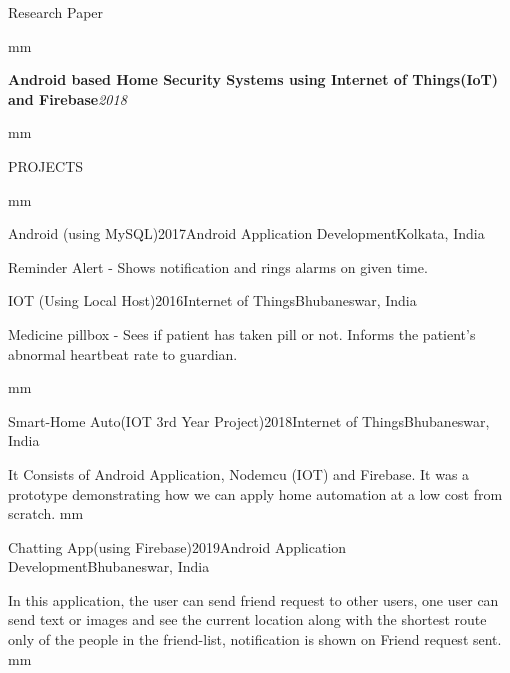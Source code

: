 \documentclass{resume}
\begin{document}
\begin{rSection}{Research Paper}
	
	 mm
	
	{\bf Android based Home Security Systems using Internet of Things(IoT) \newline
		and Firebase}{\hfill \em  2018} 
	
	 mm
	
\end{rSection}

\begin{rSection}{PROJECTS}
	
 mm

\begin{rSubsection}{Android (using MySQL)}{2017}{Android Application Development}{Kolkata, India}
	\item Reminder Alert - Shows notification and rings alarms on given time.   
\end{rSubsection}


\newpage


\begin{rSubsection}{IOT (Using Local Host)}{2016}{Internet of Things}{Bhubaneswar, India}
	\item Medicine pillbox - Sees if patient has taken pill or not. Informs the patient's abnormal heartbeat rate to guardian.   
	
	 mm
	
\end{rSubsection}

\begin{rSubsection}{Smart-Home Auto(IOT 3rd Year Project)}{2018}{Internet of Things}{Bhubaneswar, India}
 \item It Consists of Android Application, Nodemcu (IOT) and Firebase. It was a prototype demonstrating how we can apply home automation at a low cost from scratch.
 mm
\end{rSubsection}

\begin{rSubsection}{Chatting App(using Firebase)}{2019}{Android Application Development}{Bhubaneswar, India}
	\item In this application, the user can send friend request to other users, one user can send text or images and see the current location along with the shortest route only of the people in the friend-list, notification is shown on Friend request sent.  
	 mm
\end{rSubsection}

\end{rSection}
\end{document}
